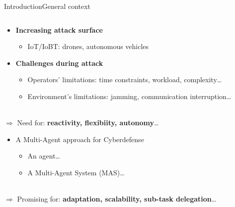 \begin{frame}{Introduction}{General context}

    \begin{columns}

        \begin{column}{0.7\textwidth}

            \begin{itemize}
                \item \textbf{Increasing attack surface}
                      \begin{itemize}
                          \item IoT/IoBT: drones, autonomous vehicles
                      \end{itemize}
                \item \textbf{Challenges during attack}
                      \begin{itemize}
                          \item Operators' limitations: time constraints, workload, complexity\dots
                          \item Environment's limitations: jamming, communication interruption\dots
                      \end{itemize}
            \end{itemize}

            \ \\

            $\Longrightarrow$ Need for: \textbf{reactivity, flexibiity, autonomy}\dots

            \begin{itemize}
                \item A Multi-Agent approach for Cyberdefense
                      \begin{itemize}
                          \item An agent\dots
                          \item A Multi-Agent System (MAS)\dots
                      \end{itemize}
            \end{itemize}

            \ \\

            $\Longrightarrow$ Promising for: \textbf{adaptation, scalability, sub-task delegation}\dots

        \end{column}


\end{columns}
\end{frame}
